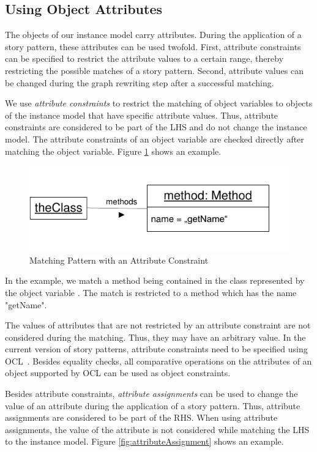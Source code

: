 \subsection{Using Object Attributes}
\label{sec:StoryPatterns:attributes}

The objects of our instance model carry attributes. 
During the application of a story pattern, these attributes can be used twofold. 
First, attribute constraints can be specified to restrict the attribute values to a certain range, thereby restricting the possible matches of a story pattern. 
Second, attribute values can be changed during the graph rewriting step after a successful matching.

We use \emph{attribute constraints} to restrict the matching of object variables to objects of the instance model that have specific attribute values. 
Thus, attribute constraints are considered to be part of the LHS and do not change the instance model. 
The attribute constraints of an object variable are checked directly after matching the object variable. 
Figure \ref{fig:objectConstraint} shows an example.

\begin{figure}[htbp]
  \centering
  \includegraphics[scale=1]{figures/ObjectConstraint}
  \caption{Matching Pattern with an Attribute Constraint}
  \label{fig:objectConstraint}
\end{figure}

In the example, we match a method being contained in the class represented by the object variable . 
The match is restricted to a method which has the name "getName".

The values of attributes that are not restricted by an attribute constraint are not considered during the matching. 
Thus, they may have an arbitrary value. 
In the current version of story patterns, attribute constraints need to be specified using OCL~\cite{OCL}. 
Besides equality checks, all comparative operations on the attributes of an object supported by OCL can be used as object constraints. 

Besides attribute constraints, \emph{attribute assignments} can be used to change the value of an attribute during the application of a story pattern. 
Thus, attribute assignments are considered to be part of the RHS. 
When using attribute assignments, the value of the attribute is not considered while matching the LHS to the instance model. 
Figure \ref{fig:attributeAssignment} shows an example.

